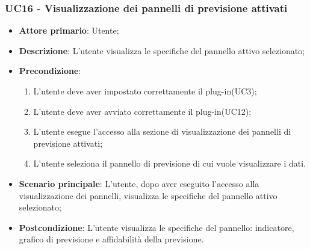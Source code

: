 \subsubsection{UC16 - Visualizzazione dei pannelli di previsione attivati}
\label{sssec:uc16}
\begin{itemize}
  \item \textbf{Attore primario}: Utente;
  \item \textbf{Descrizione}: L'utente visualizza le specifiche del pannello attivo selezionato;
  \item \textbf{Precondizione}:
  \begin{enumerate}
		\item L'utente deve aver impostato correttamente il plug-in(UC3);
		\item L'utente deve aver avviato correttamente il plug-in(UC12);
		\item L'utente esegue l'accesso alla sezione di visualizzazione dei pannelli di previsione attivati;
		\item L'utente seleziona il pannello di previsione di cui vuole visualizzare i dati.
	\end{enumerate}
  \item \textbf{Scenario principale}: L'utente, dopo aver eseguito l'accesso alla visualizzazione dei pannelli, visualizza le specifiche del pannello attivo selezionato;
  \item \textbf{Postcondizione}: L'utente visualizza le specifiche del pannello: indicatore, grafico di previsione e affidabilità della previsione.
\end{itemize}

